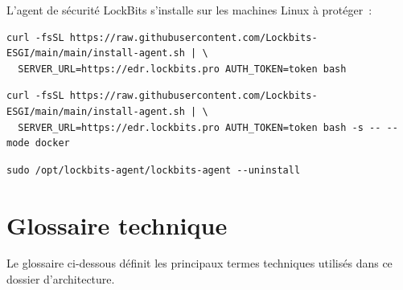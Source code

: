 L'agent de sécurité LockBits s'installe sur les machines Linux à protéger~:

\begin{lstlisting}[language=dockerbash, caption=Installation en mode binaire]
curl -fsSL https://raw.githubusercontent.com/Lockbits-ESGI/main/main/install-agent.sh | \
  SERVER_URL=https://edr.lockbits.pro AUTH_TOKEN=token bash
\end{lstlisting}

\begin{lstlisting}[language=dockerbash, caption=Installation en mode Docker]
curl -fsSL https://raw.githubusercontent.com/Lockbits-ESGI/main/main/install-agent.sh | \
  SERVER_URL=https://edr.lockbits.pro AUTH_TOKEN=token bash -s -- --mode docker
\end{lstlisting}

\begin{lstlisting}[language=dockerbash, caption=Désinstallation de l'agent]
sudo /opt/lockbits-agent/lockbits-agent --uninstall
\end{lstlisting}

\section{Glossaire technique}

Le glossaire ci-dessous définit les principaux termes techniques utilisés
dans ce dossier d'architecture.

